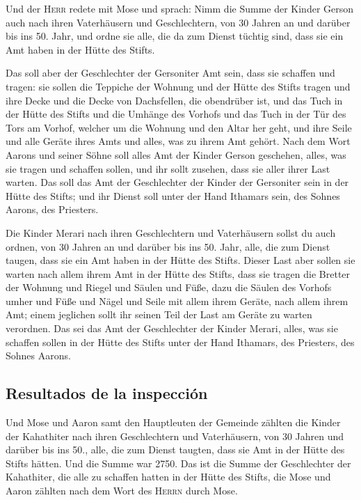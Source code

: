  Und der \textsc{Herr} redete mit Mose und sprach:
 Nimm die Summe der Kinder Gerson auch nach ihren
Vaterhäusern und Geschlechtern,  von 30 Jahren an und
darüber bis ins 50. Jahr, und ordne sie alle, die da zum Dienst tüchtig
sind, dass sie ein Amt haben in der Hütte des Stifts.

 Das soll aber der Geschlechter der Gersoniter Amt sein,
dass sie schaffen und tragen:  sie sollen die Teppiche
der Wohnung und der Hütte des Stifts tragen und ihre Decke und die Decke
von Dachsfellen, die obendrüber ist, und das Tuch in der Hütte des
Stifts  und die Umhänge des Vorhofs und das Tuch in der
Tür des Tors am Vorhof, welcher um die Wohnung und den Altar her geht,
und ihre Seile und alle Geräte ihres Amts und alles, was zu ihrem Amt
gehört.  Nach dem Wort Aarons und seiner Söhne soll alles
Amt der Kinder Gerson geschehen, alles, was sie tragen und schaffen
sollen, und ihr sollt zusehen, dass sie aller ihrer Last warten.
 Das soll das Amt der Geschlechter der Kinder der
Gersoniter sein in der Hütte des Stifts; und ihr Dienst soll unter der
Hand Ithamars sein, des Sohnes Aarons, des Priesters.

 Die Kinder Merari nach ihren Geschlechtern und
Vaterhäusern sollst du auch ordnen,  von 30 Jahren an und
darüber bis ins 50. Jahr, alle, die zum Dienst taugen, dass sie ein Amt
haben in der Hütte des Stifts.  Dieser Last aber sollen
sie warten nach allem ihrem Amt in der Hütte des Stifts, dass sie tragen
die Bretter der Wohnung und Riegel und Säulen und Füße, 
dazu die Säulen des Vorhofs umher und Füße und Nägel und Seile mit allem
ihrem Geräte, nach allem ihrem Amt; einem jeglichen sollt ihr seinen
Teil der Last am Geräte zu warten verordnen.  Das sei das
Amt der Geschlechter der Kinder Merari, alles, was sie schaffen sollen
in der Hütte des Stifts unter der Hand Ithamars, des Priesters, des
Sohnes Aarons.

\hypertarget{resultados-de-la-inspecciuxf3n}{%
\subsection{Resultados de la
inspección}\label{resultados-de-la-inspecciuxf3n}}

 Und Mose und Aaron samt den Hauptleuten der Gemeinde
zählten die Kinder der Kahathiter nach ihren Geschlechtern und
Vaterhäusern,  von 30 Jahren und darüber bis ins 50.,
alle, die zum Dienst taugten, dass sie Amt in der Hütte des Stifts
hätten.  Und die Summe war 2750.  Das ist
die Summe der Geschlechter der Kahathiter, die alle zu schaffen hatten
in der Hütte des Stifts, die Mose und Aaron zählten nach dem Wort des
\textsc{Herrn} durch Mose.

